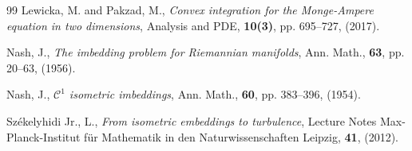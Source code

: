 \documentclass[reqno,twoside,11pt]{amsart}
\numberwithin{equation}{section}
\theoremstyle{plain}
\theoremstyle{definition}
\begin{document}
\begin{thebibliography}{99}
 {\sc Lewicka, M.  and Pakzad, M.},
{\em Convex integration for the Monge-Ampere equation in two
  dimensions}, Analysis and PDE, {\bf 10(3)}, pp. 695--727, (2017).

 {\sc Nash, J.}, {\em The imbedding problem for Riemannian
    manifolds}, Ann. Math., {\bf 63}, pp. 20--63, (1956).

 {\sc Nash, J.}, {\em $\mathcal{C}^1$ isometric
    imbeddings}, Ann. Math., {\bf 60}, pp. 383--396, (1954).

 {\sc Sz\'ekelyhidi Jr., L.}, {\em From isometric
    embeddings to turbulence}, Lecture Notes Max-Planck-Institut f\"ur Mathematik
in den Naturwissenschaften Leipzig, {\bf{41}}, (2012).

\end{thebibliography}
\end{document}
